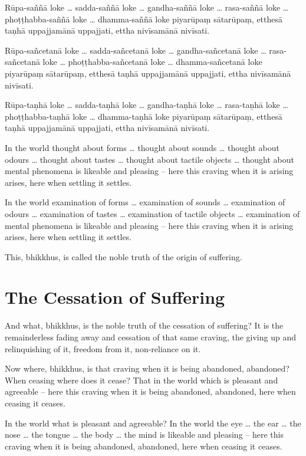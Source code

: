 Rūpa-saññā loke \ldots{} sadda-saññā loke \ldots{} gandha-saññā loke \ldots{}
rasa-saññā loke \ldots{} phoṭṭhabba-saññā loke \ldots{} dhamma-saññā loke piyarūpaṃ
sātarūpaṃ, etthesā taṇhā uppajjamānā uppajjati, ettha nivīsamānā nivīsati.

Rūpa-sañcetanā loke \ldots{} sadda-sañcetanā loke \ldots{} gandha-sañcetanā loke
\ldots{} rasa-sañcetanā loke \ldots{} phoṭṭhabba-sañcetanā loke \ldots{}
dhamma-sañcetanā loke piyarūpaṃ sātarūpaṃ, etthesā taṇhā uppajjamānā uppajjati,
ettha nivīsamānā nivīsati.

Rūpa-taṇhā loke \ldots{} sadda-taṇhā loke \ldots{} gandha-taṇhā loke \ldots{}
rasa-taṇhā loke \ldots{} phoṭṭhabba-taṇhā loke \ldots{} dhamma-taṇhā loke piyarūpaṃ
sātarūpaṃ, etthesā taṇhā uppajjamānā uppajjati, ettha nivīsamānā nivīsati.

\englishPage

In the world thought about forms \ldots{} thought about sounds \ldots{} thought
about odours \ldots{} thought about tastes \ldots{} thought about tactile
objects \ldots{} thought about mental phenomena is likeable and pleasing -- here
this craving when it is arising arises, here when settling it settles.

In the world examination of forms \ldots{} examination of sounds \ldots{}
examination of odours \ldots{} examination of tastes \ldots{} examination of
tactile objects \ldots{} examination of mental phenomena is likeable and
pleasing -- here this craving when it is arising arises, here when settling it
settles.

This, bhikkhus, is called the noble truth of the origin of suffering.

\section{The Cessation of Suffering}

And what, bhikkhus, is the noble truth of the cessation of suffering? It is the
remainderless fading away and cessation of that same craving, the giving up and
relinquishing of it, freedom from it, non-reliance on it.

Now where, bhikkhus, is that craving when it is being abandoned, abandoned? When
ceasing where does it cease? That in the world which is pleasant and agreeable
-- here this craving when it is being abandoned, abandoned, here when ceasing it
ceases.

In the world what is pleasant and agreeable? In the world the eye \ldots{} the
ear \ldots{} the nose \ldots{} the tongue \ldots{} the body \ldots{} the mind is
likeable and pleasing -- here this craving when it is being abandoned, abandoned,
here when ceasing it ceases.

